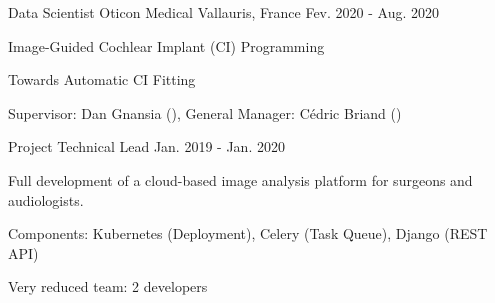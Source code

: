 

\begin{cventries}


  \cventry
    {Data Scientist} %
    {Oticon Medical} %
    {Vallauris, France} %
    {Fev. 2020 - Aug. 2020} %
    {
      \begin{cvitems} %
        \item {Image-Guided Cochlear Implant (CI) Programming \hyperlink{DDA+20}{\honordatestyle{[DDA+20]}}}
        \item {Towards Automatic CI Fitting}
        \item {Supervisor: Dan Gnansia (), General Manager: Cédric Briand ()}
      \end{cvitems}
    }

  \cventry
    {Project Technical Lead} %
    {} %
    {} %
    {Jan. 2019 - Jan. 2020} %
    {
      \begin{cvitems} %
        \item {Full development of a cloud-based image analysis platform for surgeons and audiologists. \hyperlink{DPG+19}{\honordatestyle{[DPG+19,}}\hyperlink{MM}{}\hyperlink{FR3}{}\hyperlink{NM}{}\hyperlink{UCA}{\honordatestyle{~UCA]}}}
        \item {Components: Kubernetes (Deployment), Celery (Task Queue), Django (REST API)}
        \item {Very reduced team: 2 developers}
      \end{cvitems}
    }
    

\end{cventries}
